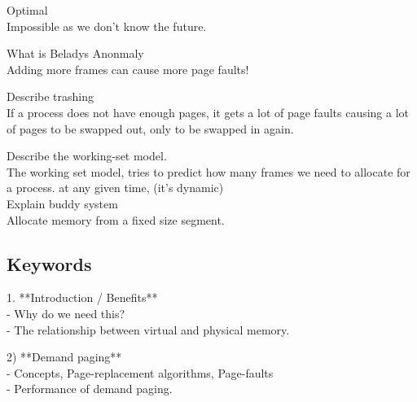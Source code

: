 \documentclass[a4paper,10pt,titlepage]{report}
\begin{document}
\hspace{10mm}Optimal \\
 \hspace{15mm}   Impossible as we don't know the future. \\
\vspace{5mm}



What is Beladys Anonmaly \\
\hspace{10mm}Adding more frames can cause more page faults! \\
\vspace{5mm}



Describe trashing \\
\hspace{10mm}If a process does not have enough pages, it gets a lot of page faults causing a lot of pages to be swapped out, only to be swapped in again. \\
\vspace{5mm}


Describe the working-set model. \\
\hspace{10mm}The working set model, tries to predict how many frames we need to allocate for a process. at any given time, (it's dynamic) \\



\vspace{5mm}
Explain buddy system \\
\hspace{15mm}Allocate memory from a fixed size segment. \\


\subsection{Keywords}

1. **Introduction / Benefits**  \\
		- Why do we need this? \\
		- The relationship between virtual and physical memory. \\

\vspace{5mm}

2) **Demand paging**  \\
		- Concepts, Page-replacement algorithms, Page-faults \\
		- Performance of demand paging. \\
\end{document}
